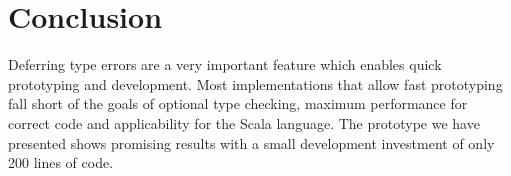 \section{Conclusion}

Deferring type errors are a very important feature which enables quick prototyping and development. Most implementations that allow fast prototyping fall short of the goals of optional type checking, maximum performance for correct code and applicability for the Scala language. The prototype we have presented shows promising results with a small development investment of only 200 lines of code.

